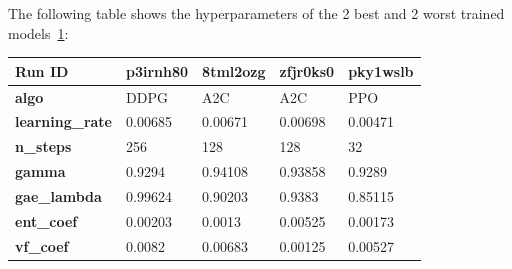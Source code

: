 \documentclass[../xlapes02]{subfiles}
\begin{document}
    The following table shows the hyperparameters of the 2 best and 2 worst trained models~\cref{tab:best-worst-hyperparameters}:
    \begin{table}[!ht]
        \centering
        \label{tab:best-worst-hyperparameters}
        \begin{tabular}{|l||l|l||l|l|}
            \hline
            \textbf{Run ID}                    & p3irnh80                                     & 8tml2ozg                                     & zfjr0ks0                                     & pky1wslb                                     \\ \hline
            \textbf{algo}                      & DDPG                                         & A2C                                          & A2C                                          & PPO                                          \\ \hline
            \textbf{learning\_rate}            & 0.00685                                      & 0.00671                                      & 0.00698                                      & 0.00471                                      \\ \hline
            \textbf{n\_steps}                  & 256                                          & 128                                          & 128                                          & 32                                           \\ \hline
            \textbf{gamma}                     & 0.9294                                       & 0.94108                                      & 0.93858                                      & 0.9289                                       \\ \hline
            \textbf{gae\_lambda}               & 0.99624                                      & 0.90203                                      & 0.9383                                       & 0.85115                                      \\ \hline
            \textbf{ent\_coef}                 & 0.00203                                      & 0.0013                                       & 0.00525                                      & 0.00173                                      \\ \hline
            \textbf{vf\_coef}                  & 0.0082                                       & 0.00683                                      & 0.00125                                      & 0.00527                                      \\ \hline

\end{tabular}
\end{table}
\end{document}
